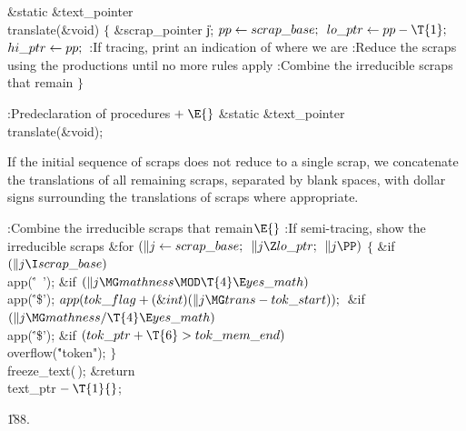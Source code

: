 \Y\B\1\1\&{static} \&{text\_pointer} \\{translate}(\&{void})\2\2\6
${}\{{}$\1\6
\&{scrap\_pointer} \|j;\7
${}\\{pp}\leftarrow\\{scrap\_base};{}$\6
${}\\{lo\_ptr}\K\\{pp}-\T{1};{}$\6
${}\\{hi\_ptr}\leftarrow\\{pp};{}$\6
:If tracing, print an indication of where we are\X\6
:Reduce the scraps using the productions until no more rules apply\X\6
:Combine the irreducible scraps that remain\X\6
\4${}\}{}$\2\par
\fi

\B{}:Predeclaration of procedures\X${}\mathrel+\E{}$\5
\&{static} \&{text\_pointer} \\{translate}(\&{void});\par
\fi

If the initial sequence of scraps does not reduce to a single scrap,
we concatenate the translations of all remaining scraps, separated by
blank spaces, with dollar signs surrounding the translations of scraps
where appropriate.

\Y\B\4:Combine the irreducible scraps that remain\X${}\E{}$\6
:If semi-tracing, show the irreducible scraps\X\6
\&{for} ${}(\|j\leftarrow\\{scrap\_base};{}$ ${}\|j\Z\\{lo\_ptr};{}$ ${}\|j\PP){}$\5
${}\{{}$\1\6
\&{if} ${}(\|j\I\\{scrap\_base}){}$\1\5
\\{app}(\.{'\ '});\2\6
\&{if} ${}(\|j\MG\\{mathness}\MOD\T{4}\E\\{yes\_math}){}$\1\5
\\{app}(\.{'\$'});\2\6
${}\\{app}(\\{tok\_flag}+(\&{int})(\|j\MG\\{trans}-\\{tok\_start}));{}$\6
\&{if} ${}(\|j\MG\\{mathness}/\T{4}\E\\{yes\_math}){}$\1\5
\\{app}(\.{'\$'});\2\6
\&{if} ${}(\\{tok\_ptr}+\T{6}>\\{tok\_mem\_end}){}$\1\5
\\{overflow}(\.{"token"});\2\6
\4${}\}{}$\2\6
\\{freeze\_text}(\,);\6
\&{return} \\{text\_ptr}${}-\T{1}{}$;\par
\U188.\fi

